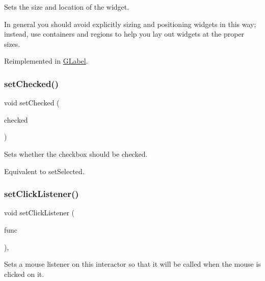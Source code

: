 Sets the size and location of the widget. 

In general you should avoid explicitly sizing and positioning widgets in this way; instead, use containers and regions to help you lay out widgets at the proper sizes. 

Reimplemented in \mbox{\hyperlink{classGLabel_adb836652705fdc4b7e90b7a3afc56a37}{G\+Label}}.

\mbox{\label{classGCheckBox_a116285e2f56247b00b26035ca0ac4737}} 
\subsubsection{\texorpdfstring{set\+Checked()}{setChecked()}}
{\footnotesize\ttfamily void set\+Checked (\begin{DoxyParamCaption}\item[{bool}]{checked }\end{DoxyParamCaption})\hspace{0.3cm}{\ttfamily [virtual]}}



Sets whether the checkbox should be checked. 

Equivalent to set\+Selected. \mbox{\label{classGInteractor_abd40af6921242584d0954f173911b190}} 
\subsubsection{\texorpdfstring{set\+Click\+Listener()}{setClickListener()}\hspace{0.1cm}{\footnotesize\ttfamily [1/2]}}
{\footnotesize\ttfamily void set\+Click\+Listener (\begin{DoxyParamCaption}\item[{G\+Event\+Listener}]{func }\end{DoxyParamCaption})\hspace{0.3cm}{\ttfamily [virtual]}, {\ttfamily [inherited]}}



Sets a mouse listener on this interactor so that it will be called when the mouse is clicked on it. 

